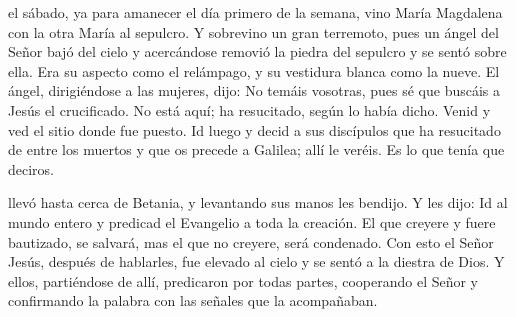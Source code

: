 \documentclass[10pt,twoside]{book}
\begin{document}
\vspace{2mm}

{}

\vspace{2mm}

\iralfinal

\vspace{5mm}

\noindent{}

\vspace{4mm}

el sábado, ya para amanecer el día primero de la semana, vino María Magdalena con la otra María al sepulcro. Y sobrevino un gran terremoto,
pues un ángel del Señor bajó del cielo y acercándose removió la piedra del sepulcro y se sentó sobre ella. Era su aspecto como el relámpago, y su vestidura blanca como la nueve.
El ángel, dirigiéndose a las mujeres, dijo: No temáis vosotras, pues sé que buscáis a Jesús el crucificado. No está aquí; ha resucitado, según lo había dicho.
Venid y ved el sitio donde fue puesto. Id luego y decid a sus discípulos que ha resucitado de entre los muertos y que os precede a Galilea; allí le veréis.
Es lo que tenía que deciros.

\vspace{2mm}



\vspace{5mm}

\noindent{}
llevó hasta cerca de Betania, y levantando sus manos les bendijo. Y les dijo: Id al mundo entero y predicad el Evangelio a toda la creación.
El que creyere y fuere bautizado, se salvará, mas el que no creyere, será condenado. Con esto el Señor Jesús, después de hablarles, fue elevado al cielo y se sentó a la diestra de Dios.
Y ellos, partiéndose de allí, predicaron por todas partes, cooperando el Señor y confirmando la palabra con las señales que la acompañaban.

\vspace{2mm}
\end{document}
